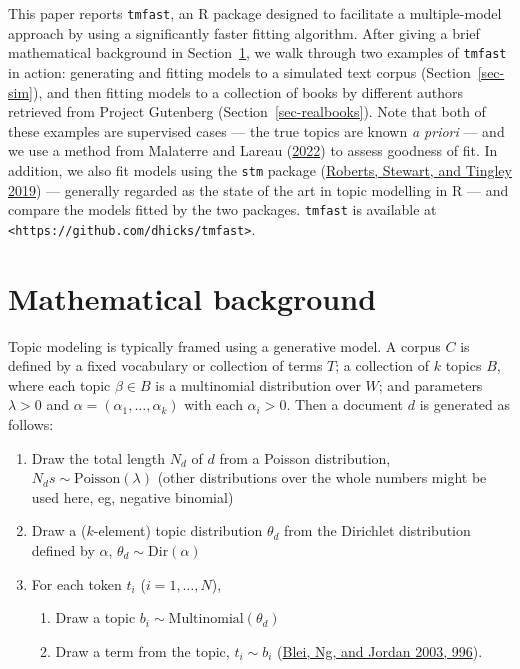 \documentclass[
]{article}
\providecommand{\tightlist}{%
  \setlength{\itemsep}{0pt}\setlength{\parskip}{0pt}}\usepackage{longtable,booktabs,array}
\begin{document}
This paper reports \texttt{tmfast}, an R package designed to facilitate
a multiple-model approach by using a significantly faster fitting
algorithm. After giving a brief mathematical background in
Section~\ref{sec-math}, we walk through two examples of \texttt{tmfast}
in action: generating and fitting models to a simulated text corpus
(Section~\ref{sec-sim}), and then fitting models to a collection of
books by different authors retrieved from Project Gutenberg
(Section~\ref{sec-realbooks}). Note that both of these examples are
supervised cases --- the true topics are known \emph{a priori} --- and
we use a method from Malaterre and Lareau
(\protect\hyperlink{ref-MalaterreEarlyDaysContemporary2022}{2022}) to
assess goodness of fit. In addition, we also fit models using the
\texttt{stm} package
(\protect\hyperlink{ref-RobertsStmPackageStructural2019}{Roberts,
Stewart, and Tingley 2019}) --- generally regarded as the state of the
art in topic modelling in R --- and compare the models fitted by the two
packages. \texttt{tmfast} is available at
\texttt{\textless{}https://github.com/dhicks/tmfast\textgreater{}}.

\hypertarget{sec-math}{%
\section{Mathematical background}\label{sec-math}}

Topic modeling is typically framed using a generative model. A corpus
\(C\) is defined by a fixed vocabulary or collection of terms \(T\); a
collection of \(k\) topics \(B\), where each topic \(\beta \in B\) is a
multinomial distribution over \(W\); and parameters \(\lambda > 0\) and
\(\alpha = (\alpha_1, \ldots, \alpha_k)\) with each \(\alpha_i > 0\).
Then a document \(d\) is generated as follows:

\begin{enumerate}
\def\labelenumi{\arabic{enumi}.}
\tightlist
\item
  Draw the total length \(N_d\) of \(d\) from a Poisson distribution,
  \(N_ds \sim \textrm{Poisson}(\lambda)\) (other distributions over the
  whole numbers might be used here, eg, negative binomial)
\item
  Draw a (\(k\)-element) topic distribution \(\theta_d\) from the
  Dirichlet distribution defined by \(\alpha\),
  \(\theta_d \sim \textrm{Dir}(\alpha)\)
\item
  For each token \(t_i\) (\(i = 1, \ldots, N\)),

  \begin{enumerate}
  \def\labelenumii{\alph{enumii}.}
  \tightlist
  \item
    Draw a topic \(b_i \sim \textrm{Multinomial}(\theta_d)\)
  \item
    Draw a term from the topic, \(t_i \sim b_i\)
    (\protect\hyperlink{ref-BleiLatentDirichletAllocation2003}{Blei, Ng,
    and Jordan 2003, 996}).
  \end{enumerate}
\end{enumerate}
\end{document}
